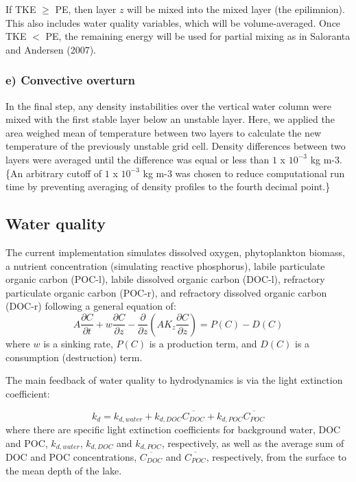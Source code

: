 \documentclass[
  letterpaper,
  DIV=11,
  numbers=noendperiod]{scrartcl}
\begin{document}
If TKE \(\geq\) PE, then layer \(z\) will be mixed into the mixed layer
(the epilimnion). This also includes water quality variables, which will
be volume-averaged. Once TKE \(<\) PE, the remaining energy will be used
for partial mixing as in Saloranta and Andersen (2007).

\hypertarget{e-convective-overturn}{%
\subsubsection{e) Convective overturn}\label{e-convective-overturn}}

In the final step, any density instabilities over the vertical water
column were mixed with the first stable layer below an unstable layer.
Here, we applied the area weighed mean of temperature between two layers
to calculate the new temperature of the previously unstable grid cell.
Density differences between two layers were averaged until the
difference was equal or less than \(1\) x \(10^{-3}\) kg m-3. \{An
arbitrary cutoff of \(1\) x \(10^{-3}\) kg m-3 was chosen to reduce
computational run time by preventing averaging of density profiles to
the fourth decimal point.\}

\hypertarget{water-quality}{%
\subsection{Water quality}\label{water-quality}}

The current implementation simulates dissolved oxygen, phytoplankton
biomass, a nutrient concentration (simulating reactive phosphorus),
labile particulate organic carbon (POC-l), labile dissolved organic
carbon (DOC-l), refractory particulate organic carbon (POC-r), and
refractory dissolved organic carbon (DOC-r) following a general equation
of: \[
A \frac{\partial C}{\partial t} + w \frac{\partial C}{\partial z} - \frac{\partial}{\partial z}(A K_z \frac{\partial C}{\partial z}) = P(C) - D(C)
\] where \(w\) is a sinking rate, \(P(C)\) is a production term, and
\(D(C)\) is a consumption (destruction) term.

The main feedback of water quality to hydrodynamics is via the light
extinction coefficient:

\[
k_d = k_{d, water} + k_{d, DOC} \overline{C_{DOC}} +  k_{d, POC} \overline{C_{POC}}
\] where there are specific light extinction coefficients for background
water, DOC and POC, \(k_{d, water}\), \(k_{d, DOC}\) and \(k_{d, POC}\),
respectively, as well as the average sum of DOC and POC concentrations,
\(\overline{C_{DOC}}\) and \(\overline{C_{POC}}\), respectively, from
the surface to the mean depth of the lake.
\end{document}
